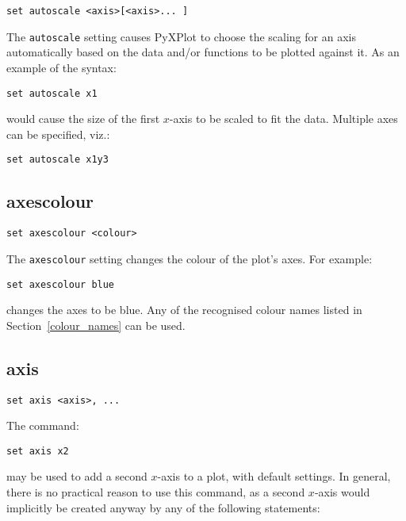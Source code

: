 \documentclass[a4paper,onecolumn,11pt]{book}
\begin{document}
\begin{verbatim}
set autoscale <axis>[<axis>... ] 
\end{verbatim}

The {\tt autoscale} setting causes PyXPlot to choose the scaling for an axis
automatically based on the data and/or functions to be plotted against it. As
an example of the syntax:

\begin{verbatim}
set autoscale x1
\end{verbatim}

\noindent would cause the size of the first $x$-axis to be scaled to fit the
data.  Multiple axes can be specified, viz.:

\begin{verbatim}
set autoscale x1y3
\end{verbatim}


\subsection{axescolour}

\begin{verbatim}
set axescolour <colour>
\end{verbatim}

The {\tt axescolour} setting changes the colour of the plot's axes.  For example:

\begin{verbatim}
set axescolour blue
\end{verbatim}

\noindent changes the axes to be blue. Any of the recognised colour names listed in
Section~\ref{colour_names} can be used.
 

\subsection{axis}

\begin{verbatim}
set axis <axis>, ...
\end{verbatim}

The command:

\begin{verbatim}
set axis x2
\end{verbatim}

\noindent may be used to add a second $x$-axis to a plot, with default settings. In
general, there is no practical reason to use this command, as a second $x$-axis
would implicitly be created anyway by any of the following statements:
\end{document}
